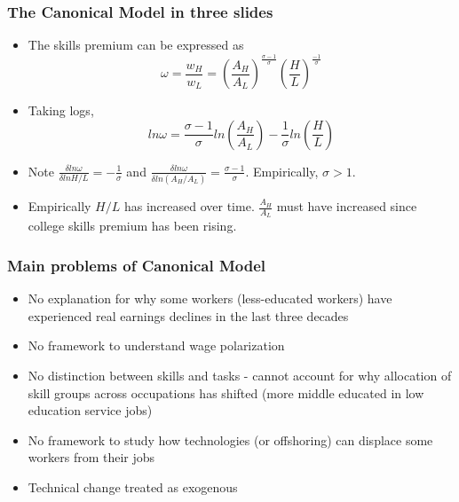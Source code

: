\documentclass[mathserif]{beamer}
\begin{document}
\begin{frame}
\frametitle{The Canonical Model in three slides}
\begin{itemize}
\item The skills premium can be expressed as
\begin{equation*}
\omega=\frac{w_H}{w_L}=(\frac{A_H}{A_L})^\frac{\sigma-1}{\sigma}(\frac{H}{L})^\frac{-1}{\sigma}
\end{equation*}
\item Taking logs,
\begin{equation*}
ln\omega=\frac{\sigma-1}{\sigma}ln(\frac{A_H}{A_L})-\frac{1}{\sigma}ln(\frac{H}{L})
\end{equation*}
\item Note $\frac{\delta ln\omega}{\delta lnH/L}=-\frac{1}{\sigma}$ and $\frac{\delta ln\omega}{\delta ln(A_H/A_L)}=\frac{\sigma-1}{\sigma}$. Empirically, $\sigma>1$.
\item Empirically $H/L$ has increased over time. $\frac{A_H}{A_L}$ must have increased since college skills premium has been rising.
\end{itemize}
\end{frame}
\begin{frame}
\frametitle{Main problems of Canonical Model}
\begin{itemize}
\item No explanation for why some workers (less-educated workers) have experienced real earnings declines in the last three decades
\item No framework to understand wage polarization
\item No distinction between skills and tasks - cannot account for why allocation of skill groups across occupations has shifted (more middle educated in low education service jobs)
\item No framework to study how technologies (or offshoring) can displace some workers from their jobs
\item Technical change treated as exogenous
\end{itemize}
\end{frame}
\end{document}
